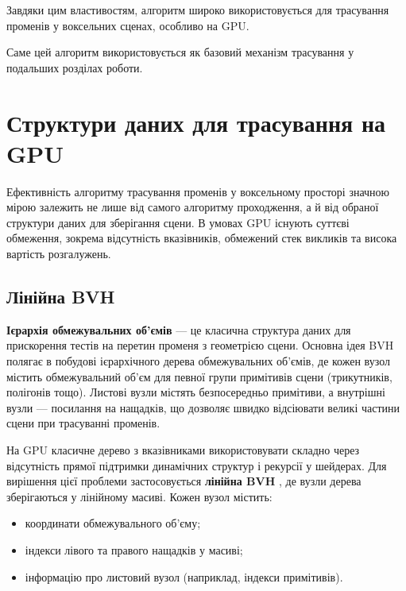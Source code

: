 Завдяки цим властивостям, алгоритм широко використовується для трасування променів у воксельних сценах, особливо на GPU.

Саме цей алгоритм використовується як базовий механізм трасування у подальших розділах роботи.

\section{Структури даних для трасування на GPU}

Ефективність алгоритму трасування променів у воксельному просторі значною мірою залежить не лише від самого алгоритму проходження, а й від обраної структури даних для зберігання сцени. В умовах GPU існують суттєві обмеження, зокрема відсутність вказівників, обмежений стек викликів та висока вартість розгалужень.

\subsection{Лінійна BVH}

\textbf{Ієрархія обмежувальних об'ємів}  — це класична структура даних для прискорення тестів на перетин променя з геометрією сцени. Основна ідея BVH полягає в побудові ієрархічного дерева обмежувальних об'ємів, де кожен вузол містить обмежувальний об'єм для певної групи примітивів сцени (трикутників, полігонів тощо). Листові вузли містять безпосередньо примітиви, а внутрішні вузли — посилання на нащадків, що дозволяє швидко відсіювати великі частини сцени при трасуванні променів.

\begin{figure}[ht!]
    \centering
    
    
    \caption{}
    \label{fig:bvh_concept}
\end{figure}

\newpage
На GPU класичне дерево з вказівниками використовувати складно через відсутність прямої підтримки динамічних структур і рекурсії у шейдерах. Для вирішення цієї проблеми застосовується \textbf{лінійна BVH} , де вузли дерева зберігаються у лінійному масиві. Кожен вузол містить:
\begin{itemize}[itemsep=0pt, topsep=0pt, label=$\diamond$]
    \item координати обмежувального об'єму;
    \item індекси лівого та правого нащадків у масиві;
    \item інформацію про листовий вузол (наприклад, індекси примітивів).
\end{itemize}

